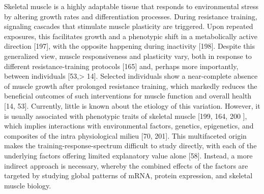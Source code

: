 \documentclass[twoside,10pt]{gihclass} %
\begin{document}
Skeletal muscle is a highly adaptable tissue that responds to environmental stress by altering growth rates and differentiation processes. During resistance training, signaling cascades that stimulate muscle plasticity are triggered. Upon repeated exposures, this facilitates growth and a phenotypic shift in a metabolically active direction {[}197{]},
with the opposite happening during inactivity {[}198{]}.
Despite this generalized view, muscle responsiveness and plasticity vary, both in response to different resistance-training protocols {[}165{]} and, perhaps more importantly, between individuals {[}53,\textgreater{} 14{]}.
Selected individuals show a near-complete absence of muscle growth after prolonged resistance training, which markedly reduces the beneficial outcomes of such interventions for muscle function and overall health {[}14, 53{]}.
Currently, little is known about the etiology of this variation. However, it is usually associated with phenotypic traits of skeletal muscle {[}199, 164, 200 {]}, which implies interactions with environmental factors, genetics, epigenetics, and composites of the intra physiological milieu {[}70, 201{]}.
This multifaceted origin makes the training-response-spectrum difficult to study directly, with each of the underlying factors offering limited explanatory value alone {[}58{]}.
Instead, a more indirect approach is necessary, whereby the combined effects of the factors are targeted by studying global patterns of mRNA, protein expression, and skeletal muscle biology.
\end{document}
